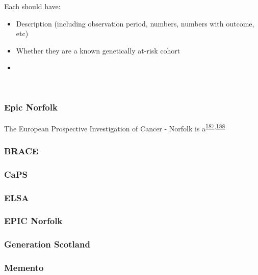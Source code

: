 \documentclass[a4paper, twoside]{templates/ociamthesis}
\providecommand{\tightlist}{%
  \setlength{\itemsep}{0pt}\setlength{\parskip}{0pt}}
\begin{document}
Each should have:

\begin{itemize}
\tightlist
\item
  Description (including observation period, numbers, numbers with outcome, etc)
\item
  Whether they are a known genetically at-risk cohort
\item
\end{itemize}

~

\hypertarget{epic-norfolk}{%
\subsubsection{Epic Norfolk}\label{epic-norfolk}}

The European Prospective Investigation of Cancer - Norfolk is a\textsuperscript{\protect\hyperlink{ref-riboli1997}{187},\protect\hyperlink{ref-riboli2002}{188}}

\hypertarget{brace}{%
\subsubsection{BRACE}\label{brace}}

\hypertarget{caps}{%
\subsubsection{CaPS}\label{caps}}

\hypertarget{elsa}{%
\subsubsection{ELSA}\label{elsa}}

\hypertarget{epic-norfolk-1}{%
\subsubsection{EPIC Norfolk}\label{epic-norfolk-1}}

\hypertarget{generation-scotland}{%
\subsubsection{Generation Scotland}\label{generation-scotland}}

\hypertarget{memento}{%
\subsubsection{Memento}\label{memento}}
\end{document}
